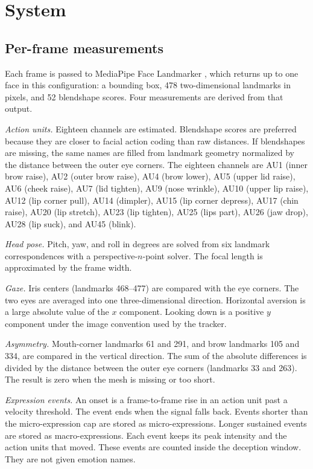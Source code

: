 \documentclass[conference]{IEEEtran}
\begin{document}
\section{System}
\subsection{Per-frame measurements}
Each frame is passed to MediaPipe Face Landmarker \cite{lugaresi2019mediapipe}, which returns up to one face in this configuration: a bounding box, 478 two-dimensional landmarks in pixels, and 52 blendshape scores. Four measurements are derived from that output.

\textit{Action units.} Eighteen channels are estimated. Blendshape scores are preferred because they are closer to facial action coding than raw distances. If blendshapes are missing, the same names are filled from landmark geometry normalized by the distance between the outer eye corners. The eighteen channels are AU1 (inner brow raise), AU2 (outer brow raise), AU4 (brow lower), AU5 (upper lid raise), AU6 (cheek raise), AU7 (lid tighten), AU9 (nose wrinkle), AU10 (upper lip raise), AU12 (lip corner pull), AU14 (dimpler), AU15 (lip corner depress), AU17 (chin raise), AU20 (lip stretch), AU23 (lip tighten), AU25 (lips part), AU26 (jaw drop), AU28 (lip suck), and AU45 (blink).

\textit{Head pose.} Pitch, yaw, and roll in degrees are solved from six landmark correspondences with a perspective-$n$-point solver. The focal length is approximated by the frame width.

\textit{Gaze.} Iris centers (landmarks 468--477) are compared with the eye corners. The two eyes are averaged into one three-dimensional direction. Horizontal aversion is a large absolute value of the $x$ component. Looking down is a positive $y$ component under the image convention used by the tracker.

\textit{Asymmetry.} Mouth-corner landmarks 61 and 291, and brow landmarks 105 and 334, are compared in the vertical direction. The sum of the absolute differences is divided by the distance between the outer eye corners (landmarks 33 and 263). The result is zero when the mesh is missing or too short.

\textit{Expression events.} An onset is a frame-to-frame rise in an action unit past a velocity threshold. The event ends when the signal falls back. Events shorter than the micro-expression cap are stored as micro-expressions. Longer sustained events are stored as macro-expressions. Each event keeps its peak intensity and the action units that moved. These events are counted inside the deception window. They are not given emotion names.
\end{document}
